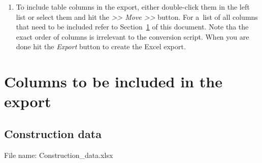 \documentclass[12pt,a4paper]{scrartcl}
\begin{document}
\begin{enumerate}
    \newpage
  \item
    To include table columns in the export, either double-click them in the left
    list or select them and hit the \emph{>> Move >>} button.
    For a~list of all columns that need to be included refer to
    Section~\ref{sec:columns} of this document.
    Note tha the exact order of columns is irrelevant to the conversion script.
    When you are done hit the \emph{Export} button to create the Excel
    export.\\[1ex]{}
\end{enumerate}


\newpage%
\section{Columns to be included in the export}%
\label{sec:columns}

\subsection{Construction data}

File name: Construction\_data.xlsx
\end{document}
